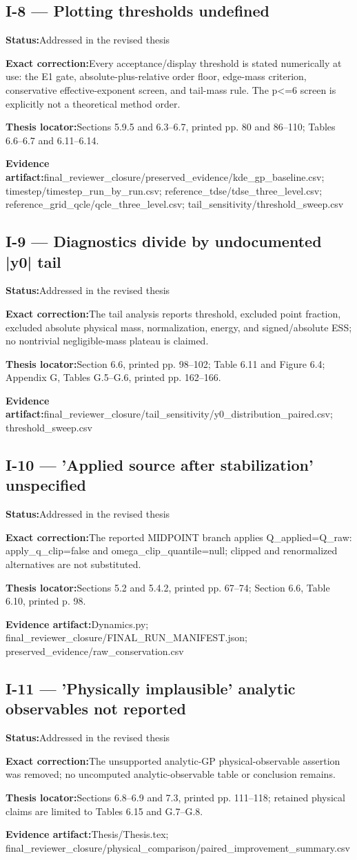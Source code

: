\documentclass[11pt]{article}
\newcommand{\field}[2]{\textbf{#1}\quad #2\par}
\begin{document}
\subsection*{I-8 --- Plotting thresholds undefined}
\field{Status:}{Addressed in the revised thesis}
\field{Exact correction:}{Every acceptance/display threshold is stated numerically at use: the E1 gate, absolute-plus-relative order floor, edge-mass criterion, conservative effective-exponent screen, and tail-mass rule. The p<=6 screen is explicitly not a theoretical method order.}
\field{Thesis locator:}{Sections 5.9.5 and 6.3--6.7, printed pp. 80 and 86--110; Tables 6.6--6.7 and 6.11--6.14.}
\field{Evidence artifact:}{final\_reviewer\_closure/preserved\_evidence/kde\_gp\_baseline.csv; timestep/timestep\_run\_by\_run.csv; reference\_tdse/tdse\_three\_level.csv; reference\_grid\_qcle/qcle\_three\_level.csv; tail\_sensitivity/threshold\_sweep.csv}
\subsection*{I-9 --- Diagnostics divide by undocumented |y0| tail}
\field{Status:}{Addressed in the revised thesis}
\field{Exact correction:}{The tail analysis reports threshold, excluded point fraction, excluded absolute physical mass, normalization, energy, and signed/absolute ESS; no nontrivial negligible-mass plateau is claimed.}
\field{Thesis locator:}{Section 6.6, printed pp. 98--102; Table 6.11 and Figure 6.4; Appendix G, Tables G.5--G.6, printed pp. 162--166.}
\field{Evidence artifact:}{final\_reviewer\_closure/tail\_sensitivity/y0\_distribution\_paired.csv; threshold\_sweep.csv}
\subsection*{I-10 --- 'Applied source after stabilization' unspecified}
\field{Status:}{Addressed in the revised thesis}
\field{Exact correction:}{The reported MIDPOINT branch applies Q\_applied=Q\_raw: apply\_q\_clip=false and omega\_clip\_quantile=null; clipped and renormalized alternatives are not substituted.}
\field{Thesis locator:}{Sections 5.2 and 5.4.2, printed pp. 67--74; Section 6.6, Table 6.10, printed p. 98.}
\field{Evidence artifact:}{Dynamics.py; final\_reviewer\_closure/FINAL\_RUN\_MANIFEST.json; preserved\_evidence/raw\_conservation.csv}
\subsection*{I-11 --- 'Physically implausible' analytic observables not reported}
\field{Status:}{Addressed in the revised thesis}
\field{Exact correction:}{The unsupported analytic-GP physical-observable assertion was removed; no uncomputed analytic-observable table or conclusion remains.}
\field{Thesis locator:}{Sections 6.8--6.9 and 7.3, printed pp. 111--118; retained physical claims are limited to Tables 6.15 and G.7--G.8.}
\field{Evidence artifact:}{Thesis/Thesis.tex; final\_reviewer\_closure/physical\_comparison/paired\_improvement\_summary.csv}
\end{document}
